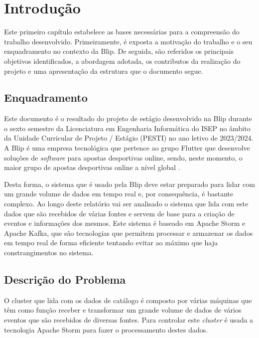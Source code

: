 \chapter{Introdução} 	
\label{sec:1-Introducao} %

Este primeiro capítulo estabelece as bases necessárias para a compreensão do trabalho desenvolvido. 
Primeiramente, é exposta a motivação do trabalho e o seu enquadramento no contexto da Blip. 
De seguida, são referidos os principais objetivos identificados, a abordagem adotada, os contributos 
da realização do projeto e uma apresentação da estrutura que o documento segue.

\section{Enquadramento}

Este documento é o resultado do projeto de estágio desenvolvido na Blip durante o sexto semestre 
da Licenciatura em Engenharia Informática do ISEP no âmbito da Unidade Curricular de Projeto / 
Estágio (PESTI) no ano letivo de 2023/2024. A Blip é uma empresa tecnológica que pertence ao grupo 
Flutter que desenvolve soluções de \textit{software} para apostas desportivas online, sendo, 
neste momento, o maior grupo de apostas desportivas online a nível global \cite{blip}.

Desta forma, o sistema que é usado pela Blip deve estar preparado para lidar com um grande volume 
de dados em tempo real e, por consequência, é bastante complexo. Ao longo deste relatório vai ser 
analisado o sistema que lida com este dados que são recebidos de várias fontes e servem de base 
para a criação de eventos e informações dos mesmos. Este sistema é baseado em Apache Storm e Apache 
Kafka, que são tecnologias que permitem processar e armazenar os dados em tempo real de forma 
eficiente tentando evitar ao máximo que haja constrangimentos no sistema.

\section{Descrição do Problema}

O \gls{cluster} que lida com os dados de catálogo é composto por várias máquinas que têm
como função receber e transformar um grande volume de dados de vários eventos que são recebidos de 
diversas fontes. Para controlar este \textit{cluster} é usada a tecnologia Apache Storm para fazer 
o processamento destes dados.

